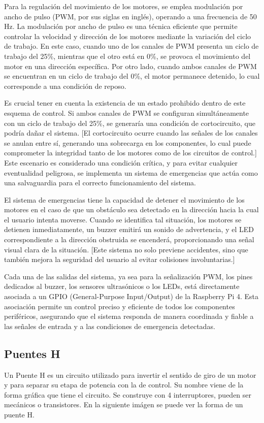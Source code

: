 \documentclass{article}
\begin{document}
Para la regulación del movimiento de los motores, se emplea modulación por ancho de pulso (PWM, por sus siglas en inglés), operando a una frecuencia de 50 Hz. La modulación por ancho de pulso es una técnica eficiente que permite controlar la velocidad y dirección de los motores mediante la variación del ciclo de trabajo. En este caso, cuando uno de los canales de PWM presenta un ciclo de trabajo del 25\%, mientras que el otro está en 0\%, se provoca el movimiento del motor en una dirección específica. Por otro lado, cuando ambos canales de PWM se encuentran en un ciclo de trabajo del 0\%, el motor permanece detenido, lo cual corresponde a una condición de reposo.

Es crucial tener en cuenta la existencia de un estado prohibido dentro de este esquema de control. Si ambos canales de PWM se configuran simultáneamente con un ciclo de trabajo del 25\%, se generaría una condición de cortocircuito, que podría dañar el sistema. [El cortocircuito ocurre cuando las señales de los canales se anulan entre sí, generando una sobrecarga en los componentes, lo cual puede comprometer la integridad tanto de los motores como de los circuitos de control.] Este escenario es considerado una condición crítica, y para evitar cualquier eventualidad peligrosa, se implementa un sistema de emergencias que actúa como una salvaguardia para el correcto funcionamiento del sistema.

El sistema de emergencias tiene la capacidad de detener el movimiento de los motores en el caso de que un obstáculo sea detectado en la dirección hacia la cual el usuario intenta moverse. Cuando se identifica tal situación, los motores se detienen inmediatamente, un buzzer emitirá un sonido de advertencia, y el LED correspondiente a la dirección obstruida se encenderá, proporcionando una señal visual clara de la situación. [Este sistema no solo previene accidentes, sino que también mejora la seguridad del usuario al evitar colisiones involuntarias.]

Cada una de las salidas del sistema, ya sea para la señalización PWM, los pines dedicados al buzzer, los sensores ultrasónicos o los LEDs, está directamente asociada a un GPIO (General-Purpose Input/Output) de la Raspberry Pi 4. Esta asociación permite un control preciso y eficiente de todos los componentes periféricos, asegurando que el sistema responda de manera coordinada y fiable a las señales de entrada y a las condiciones de emergencia detectadas.

\subsection{Puentes H}
Un Puente H es un circuito utilizado para invertir el sentido de giro de un motor y para separar su etapa de potencia con la de control. Su nombre viene de la forma gráfica que tiene el circuito. Se construye con 4 interruptores, pueden ser mecánicos o transistores. En la siguiente imágen se puede ver la forma de un puente H.
\end{document}

